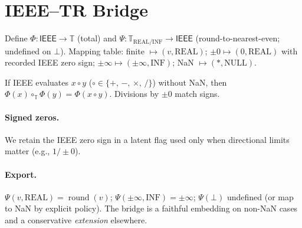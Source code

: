 \documentclass[twoside,11pt]{article}
\begin{document}
\section*{IEEE--TR Bridge}
\label{sec:ieee-tr-bridge}
Define \(\Phi:\mathsf{IEEE}\to\mathbb{T}\) (total) and \(\Psi:\mathbb{T}_{\mathrm{REAL/INF}}\to\mathsf{IEEE}\) (round-to-nearest-even; undefined on \(\bot\)). Mapping table: finite $\mapsto (v,\mathrm{REAL})$; $\pm0\mapsto (0,\mathrm{REAL})$ with recorded IEEE zero sign; $\pm\infty\mapsto (\pm\infty,\mathrm{INF})$; NaN $\mapsto (\ast,\mathrm{NULL})$.
\begin{lemma}
If IEEE evaluates $x\circ y$ (\(\circ\in\{+,\,-,\,\times,\,/\}\)) without NaN, then $\Phi(x)\circ_{\mathbb{T}}\Phi(y)=\Phi(x\circ y)$. Divisions by $\pm0$ match signs.
\end{lemma}
\paragraph{Signed zeros.} We retain the IEEE zero sign in a latent flag used only when directional limits matter (e.g., $1/\pm0$).
\paragraph{Export.} $\Psi(v,\mathrm{REAL})=\operatorname{round}(v)$; $\Psi(\pm\infty,\mathrm{INF})=\pm\infty$; $\Psi(\bot)$ undefined (or map to NaN by explicit policy). The bridge is a faithful embedding on non-NaN cases and a conservative \emph{extension} elsewhere.

\end{document}
